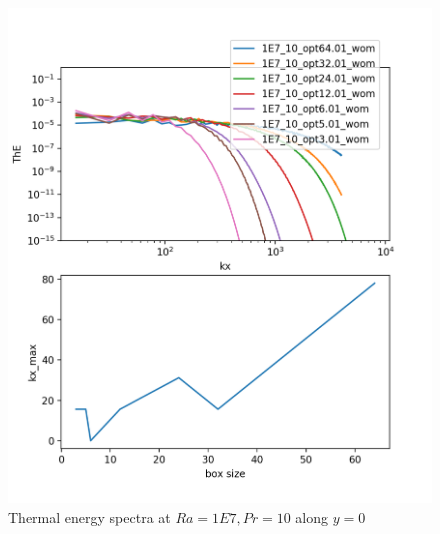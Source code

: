 \documentclass[12pt]{article}
\begin{document}
      \begin{figure}[!htb]
      	\includegraphics[width=\linewidth]{ThE_1E7_10.png}
      	\caption{ Thermal energy spectra at $Ra = 1E7, Pr =10$ along $y = 0$}
      	\label{fig:fig22}
      \end{figure}
      
\end{document}

